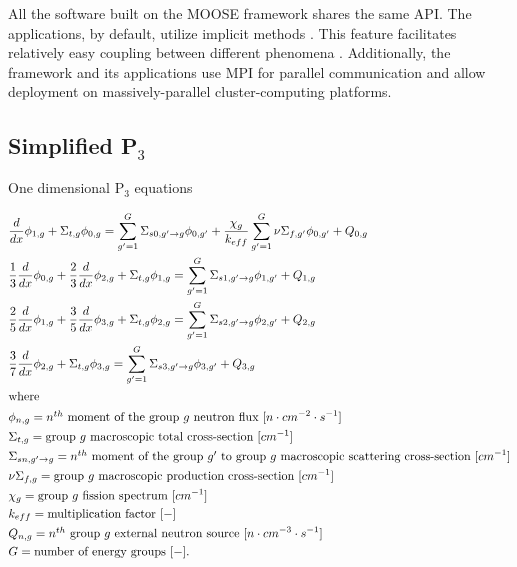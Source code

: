 \documentclass[letterpaper]{article}
\begin{document}
All the software built on the MOOSE framework shares the same \gls{API}.
The applications, by default, utilize implicit methods \cite{lindsay_introduction_2018}.
This feature facilitates relatively easy coupling between different phenomena \cite{novak_pronghorn_2018}.
Additionally, the framework and its applications use \gls{MPI} for parallel communication and allow deployment on massively-parallel cluster-computing platforms.

\subsection{Simplified P$_3$}

One dimensional P$_3$ equations
\cite{brantley_simplifiedP3_2000}

\begin{align}
    & \frac{d}{dx} \phi_{1,g} + \Sigma_{t,g} \phi_{0,g} = \sum_{g'=1}^G \Sigma_{s0,g' \rightarrow g} \phi_{0,g'} + \frac{\chi_g}{k_{eff}} \sum_{g'=1}^G \nu\Sigma_{f,g'} \phi_{0,g'} + Q_{0,g}  \label{eq:SP3-0} \\
    & \frac{1}{3} \frac{d}{dx} \phi_{0,g} + \frac{2}{3}\frac{d}{dx}\phi_{2,g} + \Sigma_{t,g} \phi_{1,g} = \sum_{g'=1}^G \Sigma_{s1,g' \rightarrow g} \phi_{1,g'} + Q_{1,g} \label{eq:SP3-1} \\
    & \frac{2}{5} \frac{d}{dx}\phi_{1,g} + \frac{3}{5}\frac{d}{dx}\phi_{3,g} + \Sigma_{t,g} \phi_{2,g} = \sum_{g'=1}^G \Sigma_{s2,g' \rightarrow g} \phi_{2,g'} + Q_{2,g} \label{eq:SP3-2} \\
    & \frac{3}{7}\frac{d}{dx}\phi_{2,g} + \Sigma_{t,g} \phi_{3,g} = \sum_{g'=1}^G \Sigma_{s3,g' \rightarrow g} \phi_{3,g'} + Q_{3,g} \label{eq:P3-3} \\
    \intertext{where}
    & \phi_{n,g} = \mbox{$n^{th}$ moment of the group $g$ neutron flux } [n \cdot cm^{-2} \cdot s^{-1}]  \notag \\
    & \Sigma_{t,g} = \mbox{group $g$ macroscopic total cross-section } [cm^{-1}]  \notag \\
	& \Sigma_{sn,g' \rightarrow g} = \mbox{$n^{th}$ moment of the group $g'$ to group $g$ macroscopic scattering cross-section } [cm^{-1}]  \notag \\
	& \nu\Sigma_{f,g} = \mbox{group $g$ macroscopic production cross-section } [cm^{-1}]  \notag \\
	& \chi_{g} = \mbox{group $g$ fission spectrum } [cm^{-1}]  \notag \\
	& k_{eff} = \mbox{multiplication factor } [-]  \notag \\
	& Q_{n,g} = \mbox{$n^{th}$ group $g$ external neutron source } [n \cdot cm^{-3} \cdot s^{-1}]  \notag \\
	& G = \mbox{number of energy groups } [-].  \notag
\end{align}
\end{document}
